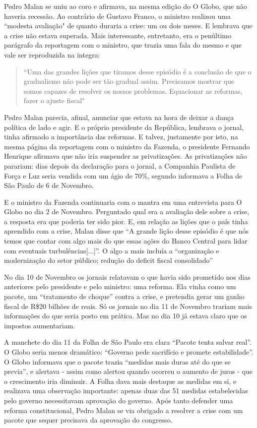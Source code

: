 \documentclass{article}
\begin{document}
Pedro Malan se uniu ao coro e afirmava, na mesma edição do O Globo, que não haveria recessão. Ao contrário de Gustavo Franco, o ministro realizou uma ``modesta avaliação" de quanto duraria a crise: um ou dois meses. E lembrava que a crise não estava superada. Mais interessante, entretanto, era o penúltimo parágrafo da reportagem com o ministro, que trazia uma fala do mesmo e que vale ser reproduzida na integra:

\begin{quote}
``Uma das grandes lições que tiramos desse episódio é a conclusão de que o gradualismo não pode ser tão gradual assim. Precisamos mostrar que somos capazes de resolver os nossos problemas. Equacionar as reformas, fazer o ajuste fiscal"
\end{quote}

Pedro Malan parecia, afinal, anunciar que estava na hora de deixar a dança política de lado e agir. E o próprio presidente da República, lembrava o jornal, tinha afirmado a importância das reformas. E talvez, justamente por isto, na mesma página da reportagem com o ministro da Fazenda, o presidente Fernando Henrique afirmava que não iria suspender as privatizações. As privatizações não parariam:  dias depois da declaração para o jornal, a Companhia Paulista de Força e Luz seria vendida com um ágio de 70\%, segundo informava a Folha de São Paulo de 6 de Novembro.

E o ministro da Fazenda continuaria com o mantra em uma entrevista para O Globo no dia 2 de Novembro. Perguntado qual era a avaliação dele sobre a crise, a resposta era que poderia ter sido pior. E, em relação as lições que o país tinha aprendido com a crise, Malan disse que ``A grande lição desse episódio é que nós temos que contar com algo mais do que essas ações do Banco Central para lidar com eventuais turbulências[...]''. O algo a mais incluía a ``organização e modernização do setor público; redução do deficit fiscal consolidado'' 

No dia 10 de Novembro os jornais relatavam o que havia sido prometido nos dias anteriores pelo presidente e pelo ministro: uma reforma. Ela vinha como um pacote, um ``tratamento de choque'' contra a crise, e pretendia gerar um ganho fiscal de R\$20 bilhões de reais. Só os jornais no dia 11 de Novembro trariam mais informações do que seria posto em prática. Mas no dia 10 já estava claro que os impostos aumentariam.

A manchete do dia 11 da Folha de São Paulo era clara ``Pacote tenta salvar real''. O Globo seria menos dramático: ``Governo pede sacrifício e promete estabilidade''. O Globo informava que o pacote trazia ``medidas mais duras até do que se previa'', e alertava - assim como alertou quando ocorreu o aumento de juros - que o crescimento iria diminuir. A Folha dava mais destaque as medidas em si, e realizava uma observação importante: apenas duas das 51 medidas estabelecidas pelo governo necessitavam aprovação do governo. Após tanto defender uma reforma constitucional, Pedro Malan se via obrigado a resolver a crise com um pacote que sequer precisava da aprovação do congresso.
\end{document}
